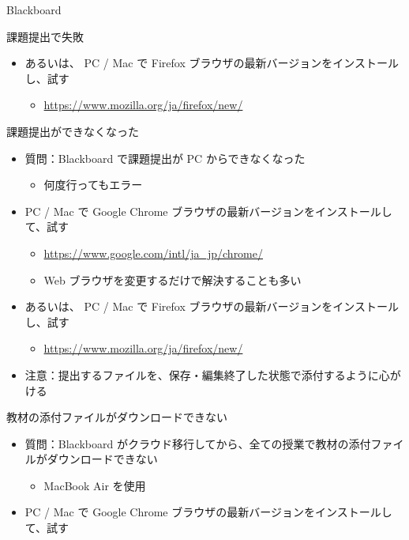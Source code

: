 \documentclass[a4j,10pt]{jsarticle}
\begin{document}
{\begin{frame}[label={sec:org166405d},fragile]{Blackboard}
\begin{block}{課題提出で失敗}
\begin{itemize}
\par
\item あるいは、 PC / Mac で Firefox ブラウザの最新バージョンをインストールし、試す
\begin{itemize}
\item \url{https://www.mozilla.org/ja/firefox/new/}
\end{itemize}
\end{itemize}
\end{block}
\par
\begin{block}{課題提出ができなくなった}
\begin{itemize}
\item 質問：Blackboard で課題提出が PC からできなくなった
\begin{itemize}
\item 何度行ってもエラー
\end{itemize}
\par
\item PC / Mac で Google Chrome ブラウザの最新バージョンをインストールして、試す
\begin{itemize}
\item \url{https://www.google.com/intl/ja\_jp/chrome/}
\item Web ブラウザを変更するだけで解決することも多い
\end{itemize}
\par
\item あるいは、 PC / Mac で Firefox ブラウザの最新バージョンをインストールし、試す
\begin{itemize}
\item \url{https://www.mozilla.org/ja/firefox/new/}
\end{itemize}
\par
\item 注意：提出するファイルを、保存・編集終了した状態で添付するように心がける
\end{itemize}
\end{block}
\par
\begin{block}{教材の添付ファイルがダウンロードできない}
\begin{itemize}
\item 質問：Blackboard がクラウド移行してから、全ての授業で教材の添付ファイルがダウンロードできない
\begin{itemize}
\item MacBook Air を使用
\end{itemize}
\par
\item PC / Mac で Google Chrome ブラウザの最新バージョンをインストールして、試す

\end{itemize}
\end{block}
\end{frame}}
\end{document}
